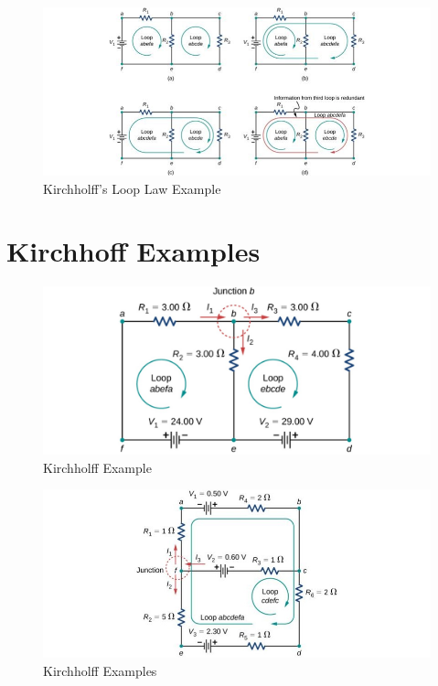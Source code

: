 \documentclass[14pt]{memoir}
\begin{document}
\begin{figure}[H]
\begin{center}
\includegraphics[scale=0.50]{fig/fig_10_25.jpg}
\caption{Kirchholff's Loop Law Example}
\label{fig:10_25}
\end{center}
\end{figure}

\section{Kirchhoff Examples}

\begin{figure}[H]
\begin{center}
\includegraphics[scale=0.50]{fig/fig_10_28.jpg}
\caption{Kirchholff Example}
\label{fig:10_28}
\end{center}
\end{figure}

\begin{figure}[H]
\begin{center}
\includegraphics[scale=0.50]{fig/fig_10_29.jpg}
\caption{Kirchholff Examples}
\label{fig:10_29}
\end{center}
\end{figure}
\end{document}
